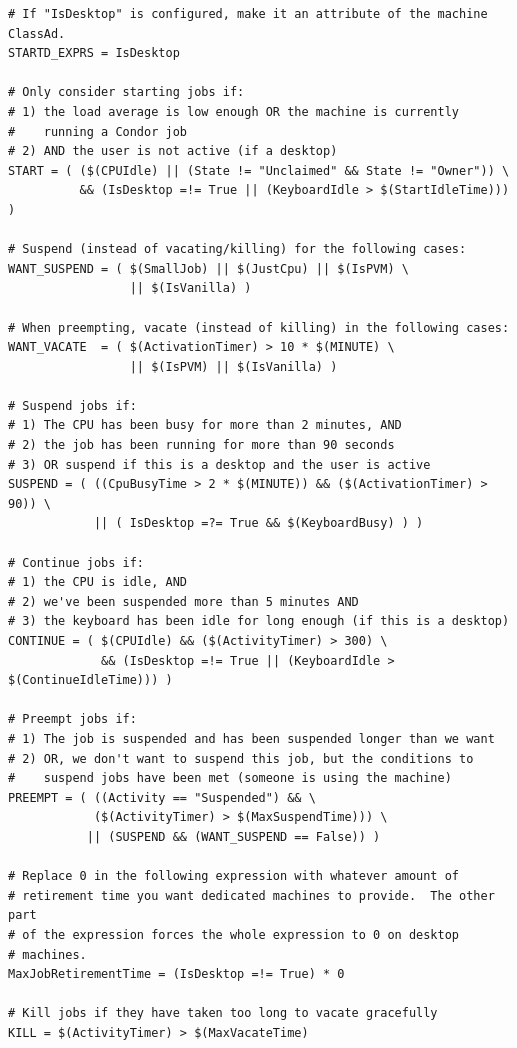 \begin{verbatim}
# If "IsDesktop" is configured, make it an attribute of the machine ClassAd.
STARTD_EXPRS = IsDesktop

# Only consider starting jobs if:
# 1) the load average is low enough OR the machine is currently
#    running a Condor job
# 2) AND the user is not active (if a desktop)
START = ( ($(CPUIdle) || (State != "Unclaimed" && State != "Owner")) \
          && (IsDesktop =!= True || (KeyboardIdle > $(StartIdleTime))) )

# Suspend (instead of vacating/killing) for the following cases:
WANT_SUSPEND = ( $(SmallJob) || $(JustCpu) || $(IsPVM) \
                 || $(IsVanilla) )

# When preempting, vacate (instead of killing) in the following cases:
WANT_VACATE  = ( $(ActivationTimer) > 10 * $(MINUTE) \
                 || $(IsPVM) || $(IsVanilla) )

# Suspend jobs if:
# 1) The CPU has been busy for more than 2 minutes, AND
# 2) the job has been running for more than 90 seconds
# 3) OR suspend if this is a desktop and the user is active
SUSPEND = ( ((CpuBusyTime > 2 * $(MINUTE)) && ($(ActivationTimer) > 90)) \
            || ( IsDesktop =?= True && $(KeyboardBusy) ) )

# Continue jobs if:
# 1) the CPU is idle, AND 
# 2) we've been suspended more than 5 minutes AND
# 3) the keyboard has been idle for long enough (if this is a desktop)
CONTINUE = ( $(CPUIdle) && ($(ActivityTimer) > 300) \
             && (IsDesktop =!= True || (KeyboardIdle > $(ContinueIdleTime))) )

# Preempt jobs if:
# 1) The job is suspended and has been suspended longer than we want
# 2) OR, we don't want to suspend this job, but the conditions to
#    suspend jobs have been met (someone is using the machine)
PREEMPT = ( ((Activity == "Suspended") && \
            ($(ActivityTimer) > $(MaxSuspendTime))) \
           || (SUSPEND && (WANT_SUSPEND == False)) )

# Replace 0 in the following expression with whatever amount of
# retirement time you want dedicated machines to provide.  The other part
# of the expression forces the whole expression to 0 on desktop
# machines.
MaxJobRetirementTime = (IsDesktop =!= True) * 0

# Kill jobs if they have taken too long to vacate gracefully
KILL = $(ActivityTimer) > $(MaxVacateTime) 

\end{verbatim}

